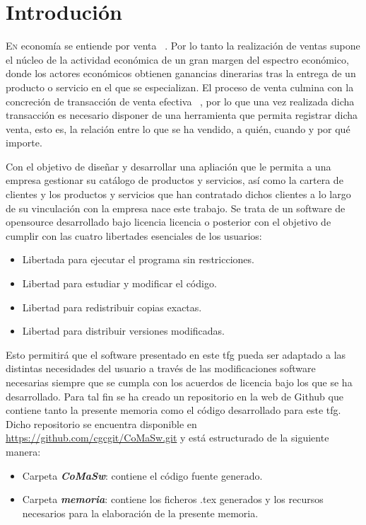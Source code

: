 \chapter{Introdución}
\label{chap:introducion}


\lettrine{E}{n} economía se entiende por venta ~\cite{ventas}. Por lo tanto la realización de ventas supone el núcleo de la actividad económica de un gran margen del espectro económico, donde los actores económicos obtienen ganancias dinerarias tras la entrega de un producto o servicio en el que se especializan. El proceso de venta culmina con la concreción de transacción de venta efectiva ~\cite{proceso-venta}, por lo que una vez realizada dicha transacción es necesario disponer de una herramienta que permita registrar dicha venta, esto es, la relación entre lo que se ha vendido, a quién, cuando y por qué importe.

Con el objetivo de diseñar y desarrollar una apliación que le permita a una empresa gestionar su catálogo de productos y servicios, así como la cartera de clientes y los productos y servicios que han contratado dichos clientes a lo largo de su vinculación con la empresa nace este trabajo. Se trata de un software de \gls{opensource} desarrollado bajo licencia \acrfull{licencia} o posterior con el objetivo de cumplir con las cuatro libertades esenciales de los usuarios:
\begin{itemize}
\item Libertada para ejecutar el programa sin restricciones.
\item Libertad para estudiar y modificar el código.
\item Libertad para redistribuir copias exactas.
\item Libertad para distribuir versiones modificadas.
\end{itemize}

Esto permitirá que el software presentado en este \acrfull{tfg} pueda ser adaptado a las distintas necesidades del usuario a través de las modificaciones software necesarias siempre que se cumpla con los acuerdos de licencia bajo los que se ha desarrollado. Para tal fin se ha creado un repositorio en la web de Github que contiene tanto la presente memoria como el código desarrollado para este \acrshort{tfg}. Dicho repositorio se encuentra disponible en \url{https://github.com/cgcgit/CoMaSw.git} y está estructurado de la siguiente manera:
\begin{itemize}
\item Carpeta \emph{\textbf{CoMaSw}}: contiene el código fuente generado.
\item Carpeta \emph{\textbf{memoria}}: contiene los ficheros .tex generados y los recursos necesarios para la elaboración de la presente memoria.
\end{itemize}

